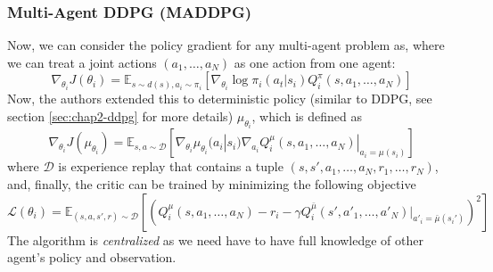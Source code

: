 \subsubsection{Multi-Agent DDPG (MADDPG) \cite{lowe2017multi}}
Now, we can consider the policy gradient for any multi-agent problem as, where we can treat a joint actions $(a_1, \dots, a_N)$ as one action from one agent:
\begin{equation}
\nabla_{\theta_i}J(\theta_i) = \mathbb{E}_{s\sim d(s), a_i \sim \pi_i} \left[ \nabla_{\theta_i} \log \pi_i(a_t | s_i) Q^{\pi}_i(s, a_1, \dots, a_N) \right]
\end{equation}
Now, the authors extended this to deterministic policy (similar to DDPG, see section \ref{sec:chap2-ddpg} for more details) $\mu_{\theta_i}$, which is defined as 
\begin{equation}
    \nabla_{\theta_i}J(\mu_{\theta_i}) = \mathbb{E}_{s, a \sim \mathcal{D}} \left[ \nabla_{\theta_i} \mu_{\theta_i}(a_i | s_i) \nabla_{a_i} Q^{\mu}_i(s, a_1, \dots, a_N) |_{a_i = \mu(s_i)} \right]
\end{equation}
where $\mathcal{D}$ is experience replay that contains a tuple $(s, s', a_1, \dots, a_N, r_1, \dots, r_N)$, and, finally, the critic can be trained by minimizing the following objective 
\begin{equation}
    \mathcal{L}(\theta_i) = \mathbb{E}_{(s, a, s', r) \sim \mathcal{D}}\left[ \left( Q^{\mu}_i (s, a_1, \dots, a_N) - r_i - \gamma Q^{\bar{\mu}}_i(s', a'_1, \dots, a'_N) |_{a'_i = \bar{\mu}(s_i')} \right)^2  \right]
\end{equation}
The algorithm is \textit{centralized} as we need have to have full knowledge of other agent's policy and observation.

